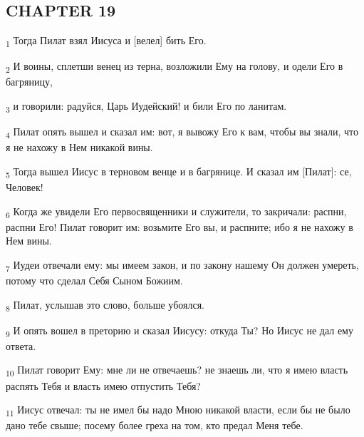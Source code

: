 \subsection{CHAPTER 19}
\begin{tcolorbox}
\textsubscript{1} Тогда Пилат взял Иисуса и [велел] бить Его.
\end{tcolorbox}
\begin{tcolorbox}
\textsubscript{2} И воины, сплетши венец из терна, возложили Ему на голову, и одели Его в багряницу,
\end{tcolorbox}
\begin{tcolorbox}
\textsubscript{3} и говорили: радуйся, Царь Иудейский! и били Его по ланитам.
\end{tcolorbox}
\begin{tcolorbox}
\textsubscript{4} Пилат опять вышел и сказал им: вот, я вывожу Его к вам, чтобы вы знали, что я не нахожу в Нем никакой вины.
\end{tcolorbox}
\begin{tcolorbox}
\textsubscript{5} Тогда вышел Иисус в терновом венце и в багрянице. И сказал им [Пилат]: се, Человек!
\end{tcolorbox}
\begin{tcolorbox}
\textsubscript{6} Когда же увидели Его первосвященники и служители, то закричали: распни, распни Его! Пилат говорит им: возьмите Его вы, и распните; ибо я не нахожу в Нем вины.
\end{tcolorbox}
\begin{tcolorbox}
\textsubscript{7} Иудеи отвечали ему: мы имеем закон, и по закону нашему Он должен умереть, потому что сделал Себя Сыном Божиим.
\end{tcolorbox}
\begin{tcolorbox}
\textsubscript{8} Пилат, услышав это слово, больше убоялся.
\end{tcolorbox}
\begin{tcolorbox}
\textsubscript{9} И опять вошел в преторию и сказал Иисусу: откуда Ты? Но Иисус не дал ему ответа.
\end{tcolorbox}
\begin{tcolorbox}
\textsubscript{10} Пилат говорит Ему: мне ли не отвечаешь? не знаешь ли, что я имею власть распять Тебя и власть имею отпустить Тебя?
\end{tcolorbox}
\begin{tcolorbox}
\textsubscript{11} Иисус отвечал: ты не имел бы надо Мною никакой власти, если бы не было дано тебе свыше; посему более греха на том, кто предал Меня тебе.
\end{tcolorbox}
